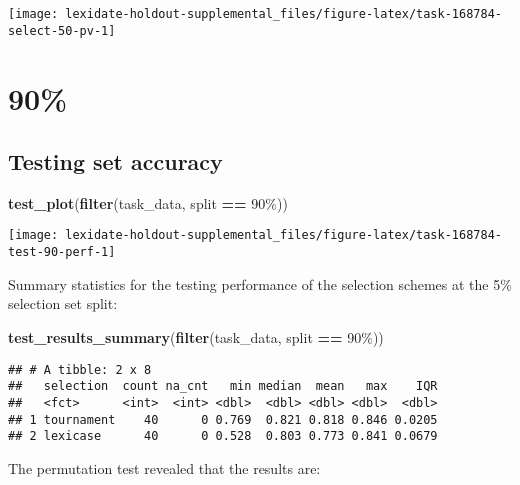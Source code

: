 \documentclass[
]{book}
\newenvironment{Shaded}{\begin{snugshade}}{\end{snugshade}}
\newcommand{\FunctionTok}[1]{\textcolor[rgb]{0.13,0.29,0.53}{\textbf{#1}}}
\newcommand{\NormalTok}[1]{#1}
\newcommand{\SpecialCharTok}[1]{\textcolor[rgb]{0.81,0.36,0.00}{\textbf{#1}}}
\newcommand{\StringTok}[1]{\textcolor[rgb]{0.31,0.60,0.02}{#1}}
\begin{document}
\texttt{[image: lexidate-holdout-supplemental\_files/figure-latex/task-168784-select-50-pv-1]}

\hypertarget{section-53}{%
\section{90\%}\label{section-53}}

\hypertarget{testing-set-accuracy-53}{%
\subsection{Testing set accuracy}\label{testing-set-accuracy-53}}

\begin{Shaded}
\begin{Highlighting}[]
\FunctionTok{test\_plot}\NormalTok{(}\FunctionTok{filter}\NormalTok{(task\_data, split }\SpecialCharTok{==} \StringTok{\textquotesingle{}90\%\textquotesingle{}}\NormalTok{))}
\end{Highlighting}
\end{Shaded}

\texttt{[image: lexidate-holdout-supplemental\_files/figure-latex/task-168784-test-90-perf-1]}

Summary statistics for the testing performance of the selection schemes at the 5\% selection set split:

\begin{Shaded}
\begin{Highlighting}[]
\FunctionTok{test\_results\_summary}\NormalTok{(}\FunctionTok{filter}\NormalTok{(task\_data, split }\SpecialCharTok{==} \StringTok{\textquotesingle{}90\%\textquotesingle{}}\NormalTok{))}
\end{Highlighting}
\end{Shaded}

\begin{verbatim}
## # A tibble: 2 x 8
##   selection  count na_cnt   min median  mean   max    IQR
##   <fct>      <int>  <int> <dbl>  <dbl> <dbl> <dbl>  <dbl>
## 1 tournament    40      0 0.769  0.821 0.818 0.846 0.0205
## 2 lexicase      40      0 0.528  0.803 0.773 0.841 0.0679
\end{verbatim}

The permutation test revealed that the results are:
\end{document}
